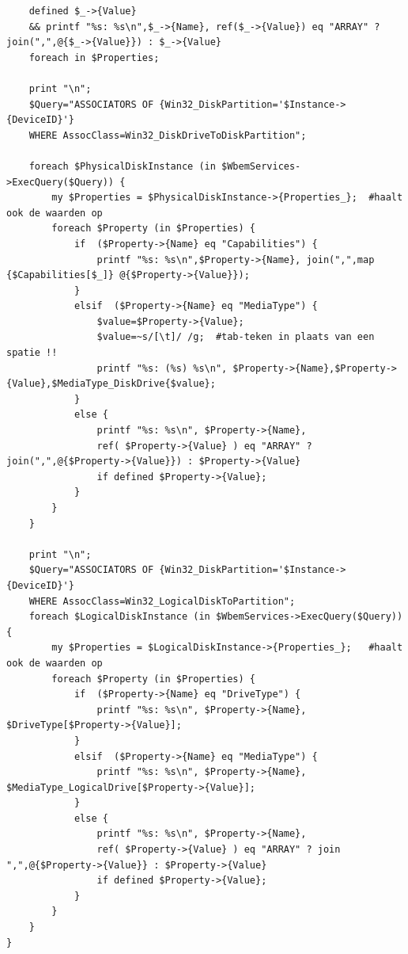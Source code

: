 \documentclass[11pt,a4paper]{report}
\begin{document}
\begin{enumerate}[resume]
\begin{lstlisting}
	defined $_->{Value}
	&& printf "%s: %s\n",$_->{Name}, ref($_->{Value}) eq "ARRAY" ? join(",",@{$_->{Value}}) : $_->{Value}
	foreach in $Properties;
	
	print "\n";
	$Query="ASSOCIATORS OF {Win32_DiskPartition='$Instance->{DeviceID}'} 
	WHERE AssocClass=Win32_DiskDriveToDiskPartition";
	
	foreach $PhysicalDiskInstance (in $WbemServices->ExecQuery($Query)) {
		my $Properties = $PhysicalDiskInstance->{Properties_};  #haalt ook de waarden op
		foreach $Property (in $Properties) {
			if  ($Property->{Name} eq "Capabilities") {
				printf "%s: %s\n",$Property->{Name}, join(",",map {$Capabilities[$_]} @{$Property->{Value}});
			}
			elsif  ($Property->{Name} eq "MediaType") {
				$value=$Property->{Value};
				$value=~s/[\t]/ /g;  #tab-teken in plaats van een spatie !!
				printf "%s: (%s) %s\n", $Property->{Name},$Property->{Value},$MediaType_DiskDrive{$value};
			}
			else {
				printf "%s: %s\n", $Property->{Name}, 
				ref( $Property->{Value} ) eq "ARRAY" ? join(",",@{$Property->{Value}}) : $Property->{Value}
				if defined $Property->{Value};
			}
		}
	}

	print "\n";
	$Query="ASSOCIATORS OF {Win32_DiskPartition='$Instance->{DeviceID}'} 
	WHERE AssocClass=Win32_LogicalDiskToPartition";
	foreach $LogicalDiskInstance (in $WbemServices->ExecQuery($Query)) {
		my $Properties = $LogicalDiskInstance->{Properties_};   #haalt ook de waarden op
		foreach $Property (in $Properties) {
			if  ($Property->{Name} eq "DriveType") {
				printf "%s: %s\n", $Property->{Name}, $DriveType[$Property->{Value}];				
			}
			elsif  ($Property->{Name} eq "MediaType") {
				printf "%s: %s\n", $Property->{Name}, $MediaType_LogicalDrive[$Property->{Value}];
			}
			else {
				printf "%s: %s\n", $Property->{Name}, 
				ref( $Property->{Value} ) eq "ARRAY" ? join ",",@{$Property->{Value}} : $Property->{Value}
				if defined $Property->{Value};
			}
		} 
	}
}
	\end{lstlisting}
\end{enumerate}
\end{document}
